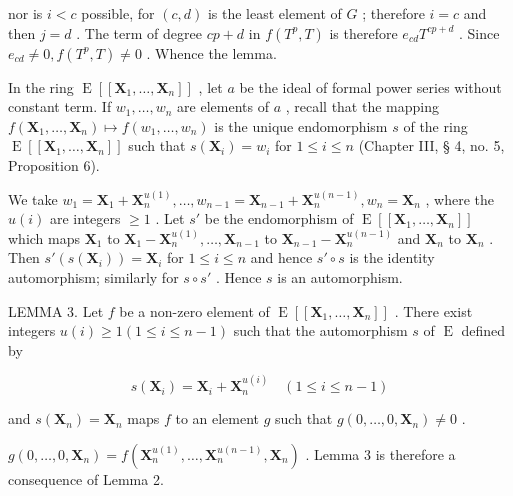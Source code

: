 nor is \(i < c\) possible, for \((c, d)\) is the least element of \(G\) ; therefore \(i = c\) and then \(j = d\) . The term of degree \(cp + d\) in \(f(T^p, T)\) is therefore \(e_{cd}T^{cp + d}\) . Since \(e_{cd} \neq 0, f(T^p, T) \neq 0\) . Whence the lemma.

In the ring \(\operatorname{E}[[\mathbf{X}_1, \ldots, \mathbf{X}_n]]\) , let \(a\) be the ideal of formal power series without constant term. If \(w_1, \ldots, w_n\) are elements of \(a\) , recall that the mapping \(f(\mathbf{X}_1, \ldots, \mathbf{X}_n) \mapsto f(w_1, \ldots, w_n)\) is the unique endomorphism \(s\) of the ring \(\operatorname{E}[[\mathbf{X}_1, \ldots, \mathbf{X}_n]]\) such that \(s(\mathbf{X}_i) = w_i\) for \(1 \leqslant i \leqslant n\) (Chapter III, § 4, no. 5, Proposition 6).

We take \(w_1 = \mathbf{X}_1 + \mathbf{X}_n^{u(1)}, \ldots, w_{n-1} = \mathbf{X}_{n-1} + \mathbf{X}_n^{u(n-1)}, w_n = \mathbf{X}_n\) , where the \(u(i)\) are integers \(\geqslant 1\) . Let \(s'\) be the endomorphism of \(\operatorname{E}[[\mathbf{X}_1, \ldots, \mathbf{X}_n]]\) which maps \(\mathbf{X}_1\) to \(\mathbf{X}_1 - \mathbf{X}_n^{u(1)}, \ldots, \mathbf{X}_{n-1}\) to \(\mathbf{X}_{n-1} - \mathbf{X}_n^{u(n-1)}\) and \(\mathbf{X}_n\) to \(\mathbf{X}_n\) . Then \(s'(s(\mathbf{X}_i)) = \mathbf{X}_i\) for \(1 \leqslant i \leqslant n\) and hence \(s' \circ s\) is the identity automorphism; similarly for \(s \circ s'\) . Hence \(s\) is an automorphism.

LEMMA 3. Let \(f\) be a non-zero element of \(\operatorname{E}[[\mathbf{X}_1, \ldots, \mathbf{X}_n]]\) . There exist integers \(u(i) \geqslant 1 (1 \leqslant i \leqslant n - 1)\) such that the automorphism \(s\) of \(\operatorname{E}\) defined by

\[
s (\mathbf {X} _ {i}) = \mathbf {X} _ {i} + \mathbf {X} _ {n} ^ {u (i)} \quad (1 \leqslant i \leqslant n - 1)
\]

and \(s(\mathbf{X}_n) = \mathbf{X}_n\) maps \(f\) to an element \(g\) such that \(g(0, \ldots, 0, \mathbf{X}_n) \neq 0\) .

\(g(0,\ldots,0,\mathbf{X}_n) = f(\mathbf{X}_n^{u(1)},\ldots ,\mathbf{X}_n^{u(n - 1)},\mathbf{X}_n)\) . Lemma 3 is therefore a consequence of Lemma 2.

